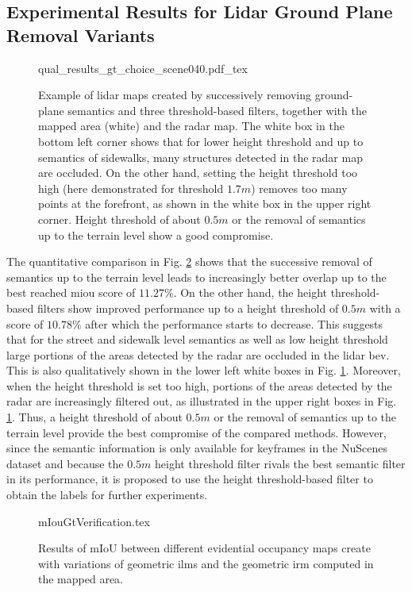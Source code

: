 \subsection{Experimental Results for Lidar Ground Plane Removal Variants}
\label{subsec:exp_results_gt}
\begin{figure}[H]
	\begin{center}
		{qual_results_gt_choice_scene040.pdf_tex}
		\caption{\label{fig:qual_results_gt_choice_scene040}Example of lidar maps created by successively removing ground-plane semantics and three threshold-based filters, together with the mapped area (white) and the radar map. The white box in the bottom left corner shows that for lower height threshold and up to semantics of sidewalks, many structures detected in the radar map are occluded. On the other hand, setting the height threshold too high (here demonstrated for threshold $1.7m$) removes too many points at the forefront, as shown in the white box in the upper right corner. Height threshold of about $0.5m$ or the removal of semantics up to the terrain level show a good compromise.}
	\end{center}
\end{figure} 
The quantitative comparison in Fig. \ref{fig:miou_results_gt_choice} shows that the successive removal of semantics up to the terrain level leads to increasingly better overlap up to the best reached m\gls{iou} score of $11.27\%$. On the other hand, the height threshold-based filters show improved performance up to a height threshold of $0.5m$ with a score of $10.78\%$ after which the performance starts to decrease. This suggests that for the street and sidewalk level semantics as well as low height threshold large portions of the areas detected by the radar are occluded in the lidar \gls{bev}. This is also qualitatively shown in the lower left white boxes in Fig. \ref{fig:qual_results_gt_choice_scene040}. Moreover, when the height threshold is set too high, portions of the areas detected by the radar are increasingly filtered out, as illustrated in the upper right boxes in Fig. \ref{fig:qual_results_gt_choice_scene040}. Thus, a height threshold of about $0.5m$ or the removal of semantics up to the terrain level provide the best compromise of the compared methods. However, since the semantic information is only available for keyframes in the NuScenes dataset and because the $0.5m$ height threshold filter rivals the best semantic filter in its performance, it is proposed to use the height threshold-based filter to obtain the labels for further experiments.
\begin{figure}[htp!]
	\begin{center}
		{mIouGtVerification.tex}
		\caption{\label{fig:miou_results_gt_choice}Results of mIoU between different evidential occupancy maps create with variations of geometric \gls{ilm}s and the geometric \gls{irm} computed in the mapped area.}
	\end{center}
\end{figure}
%
